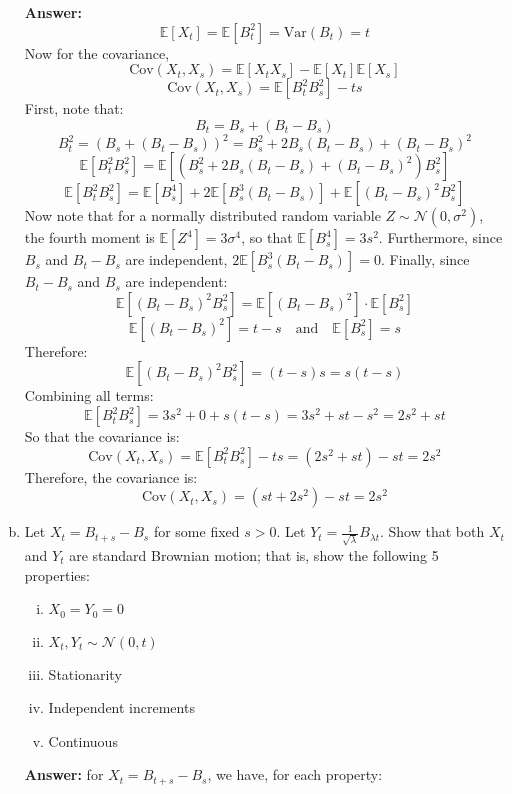 \documentclass[11pt]{extarticle}
\theoremstyle{plain}
\theoremstyle{definition}
\begin{document}
\begin{enumerate}[(a)]
\textbf{Answer:} 
\[
\mathbb{E}[X_t] = \mathbb{E}[B_t^2] = \text{Var}(B_t) = t
\]
Now for the covariance,
\[
\text{Cov}(X_t, X_s) = \mathbb{E}[X_t X_s] - \mathbb{E}[X_t] \mathbb{E}[X_s]
\]
\[
\text{Cov}(X_t, X_s) = \mathbb{E}[B_t^2 B_s^2] - ts
\]
First, note that:
   \[
   B_t = B_s + (B_t - B_s)
   \]
   \[
   B_t^2 = \left( B_s + (B_t - B_s) \right)^2 = B_s^2 + 2 B_s (B_t - B_s) + (B_t - B_s)^2
   \]
   \[
   \mathbb{E}[B_t^2 B_s^2] = \mathbb{E}\left[ \left( B_s^2 + 2 B_s (B_t - B_s) + (B_t - B_s)^2 \right) B_s^2 \right]
   \]
   \[
   \mathbb{E}[B_t^2 B_s^2] = \mathbb{E}[B_s^4] + 2 \mathbb{E}\left[ B_s^3 (B_t - B_s) \right] + \mathbb{E}\left[ (B_t - B_s)^2 B_s^2 \right]
   \]
Now note that for a normally distributed random variable \( Z \sim \mathcal{N}(0, \sigma^2) \), the fourth moment is $ \mathbb{E}[Z^4] = 3 \sigma^4$, so that  $  \mathbb{E}[B_s^4] = 3 s^2$. Furthermore, since \( B_s \) and \( B_t - B_s \) are independent, $2 \mathbb{E}\left[ B_s^3 (B_t - B_s) \right] = 0$. Finally, since \( B_t - B_s \) and \( B_s \) are independent:
     \[
     \mathbb{E}\left[ (B_t - B_s)^2 B_s^2 \right] = \mathbb{E}\left[ (B_t - B_s)^2 \right] \cdot \mathbb{E}\left[ B_s^2 \right]
     \]
     \[
     \mathbb{E}\left[ (B_t - B_s)^2 \right] = t - s \quad \text{and} \quad \mathbb{E}\left[ B_s^2 \right] = s
     \]
     Therefore:
     \[
     \mathbb{E}\left[ (B_t - B_s)^2 B_s^2 \right] = (t - s) s = s(t - s)
     \]
Combining all terms:
   \[
   \mathbb{E}[B_t^2 B_s^2] = 3 s^2 + 0 + s(t - s) = 3 s^2 + s t - s^2 = 2 s^2 + s t
   \]
So that the covariance is:
   \[
   \text{Cov}(X_t, X_s) = \mathbb{E}[B_t^2 B_s^2] - ts = (2 s^2 + s t) - s t = 2 s^2
   \]
Therefore, the covariance is:
\[
\text{Cov}(X_t, X_s) = (st + 2s^2) - st = 2s^2
\]

\item Let $X_t = B_{t+s} - B_s$ for some fixed $s > 0$. Let $Y_t = \frac{1}{\sqrt \lambda} B_{\lambda t}$. Show that both $X_t$ and $Y_t$ are standard Brownian motion; that is, show the following 5 properties: 
\begin{enumerate}[(i)]
\item $X_0 = Y_0 = 0$ 
\item $X_t, Y_t \sim \mathcal N(0, t)$ 
\item Stationarity
\item Independent increments 
\item Continuous 
\end{enumerate}

\textbf{Answer:} for \( X_t = B_{t+s} - B_s \), we have, for each property:


\end{enumerate}
\end{document}
